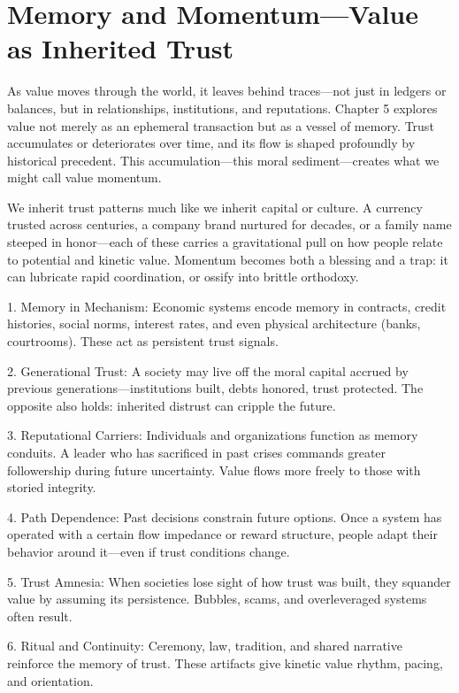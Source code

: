 \documentclass[11pt,oneside]{book}
\begin{document}
\section{Memory and Momentum—Value as Inherited Trust}

As value moves through the world, it leaves behind traces—not just in ledgers or balances, but in relationships, institutions, and reputations. Chapter 5 explores value not merely as an ephemeral transaction but as a vessel of memory. Trust accumulates or deteriorates over time, and its flow is shaped profoundly by historical precedent. This accumulation—this moral sediment—creates what we might call value momentum.

We inherit trust patterns much like we inherit capital or culture. A currency trusted across centuries, a company brand nurtured for decades, or a family name steeped in honor—each of these carries a gravitational pull on how people relate to potential and kinetic value. Momentum becomes both a blessing and a trap: it can lubricate rapid coordination, or ossify into brittle orthodoxy.

1. Memory in Mechanism: Economic systems encode memory in contracts, credit histories, social norms, interest rates, and even physical architecture (banks, courtrooms). These act as persistent trust signals.

2. Generational Trust: A society may live off the moral capital accrued by previous generations—institutions built, debts honored, trust protected. The opposite also holds: inherited distrust can cripple the future.

3. Reputational Carriers: Individuals and organizations function as memory conduits. A leader who has sacrificed in past crises commands greater followership during future uncertainty. Value flows more freely to those with storied integrity.

4. Path Dependence: Past decisions constrain future options. Once a system has operated with a certain flow impedance or reward structure, people adapt their behavior around it—even if trust conditions change.

5. Trust Amnesia: When societies lose sight of how trust was built, they squander value by assuming its persistence. Bubbles, scams, and overleveraged systems often result.

6. Ritual and Continuity: Ceremony, law, tradition, and shared narrative reinforce the memory of trust. These artifacts give kinetic value rhythm, pacing, and orientation.
\end{document}
